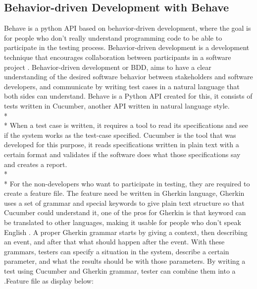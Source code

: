 \subsection{Behavior-driven Development with Behave}
Behave is a python API based on behavior-driven development, where the goal is for people who don’t really understand programming code to be able to participate in the testing process. Behavior-driven development is a development technique that encourages collaboration between participants in a software project \cite{Reference13}. Behavior-driven development or BDD, aims to have a clear understanding of the desired software behavior between stakeholders and software developers, and communicate by writing test cases in a natural language that both sides can understand. Behave is a Python API created for this, it consists of tests written in Cucumber, another API written in natural language style. \\*\\*
When a test case is written, it requires a tool to read its specifications and see if the system works as the test-case specified. Cucumber is the tool that was developed for this purpose, it reads specifications written in plain text with a certain format and validates if the software does what those specifications say \cite{Reference14} and creates a report. \\*\\*
For the non-developers who want to participate in testing, they are required to create a feature file. The feature need be written in Gherkin language, Gherkin uses a set of grammar and special keywords to give plain text structure so that Cucumber could understand it, one of the pros for Gherkin is that keyword can be translated to other languages, making it usable for people who don’t speak English \cite{Reference15}. A proper Gherkin grammar starts by giving a context, then describing an event, and after that what should happen after the event. With these grammars, testers can specify a situation in the system, describe a certain parameter, and what the results should be with those parameters. By writing a test using Cucumber and Gherkin grammar, tester can combine them into a .Feature file as display below: 
